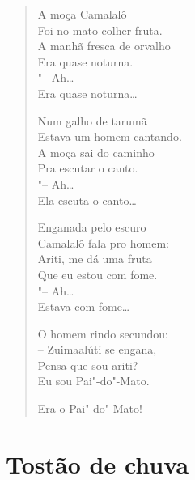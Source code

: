 \begin{verse}
A moça Camalalô\\
Foi no mato colher fruta.\\
A manhã fresca de orvalho\\
Era quase noturna.\\
\quad"-- Ah\ldots{}\\
Era quase noturna\ldots{}

Num galho de tarumã\\
Estava um homem cantando.\\
A moça sai do caminho\\
Pra escutar o canto.\\
\quad"-- Ah\ldots{}\\
Ela escuta o canto\ldots{}

Enganada pelo escuro\\
Camalalô fala pro homem:\\
Ariti, me dá uma fruta\\
Que eu estou com fome.\\
\quad"-- Ah\ldots{}\\
Estava com fome\ldots{}

O homem rindo secundou:\\
-- Zuimaalúti se engana,\\
Pensa que sou ariti?\\
Eu sou Pai"-do"-Mato.

Era o Pai"-do"-Mato!
\end{verse}

\pagebreak
{}
\section*{Tostão de chuva}

